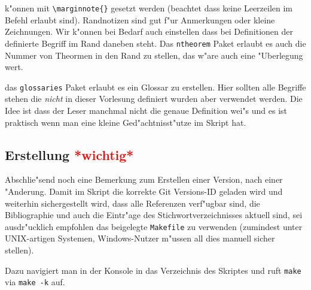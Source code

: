 \documentclass[paper=A4, twoside, chapterprefix=true, bibliography=totoc, headsepline]{scrbook}
\renewcommand{\thesection}{\arabic{section}}
\renewcommand*{\sectionmarkformat}{\thesection\autodot\enskip}
\begin{document}
\begin{description}[font=\normalfont\itshape]
	k"onnen mit \verb|\marginnote{}| gesetzt werden (beachtet dass keine Leerzeilen im Befehl erlaubt sind).
	Randnotizen sind gut f"ur Anmerkungen oder kleine Zeichnungen.
	Wir k"onnen bei Bedarf auch einstellen dass bei Definitionen der definierte Begriff im Rand daneben steht.
	Das \verb|ntheorem| Paket erlaubt es auch die Nummer von Theormen in den Rand zu stellen, das w"are auch eine "Uberlegung wert.
\item[Glossareintr"age:]
	das \verb|glossaries| Paket erlaubt es ein Glossar zu erstellen.
	Hier sollten alle Begriffe stehen die \emph{nicht} in dieser Vorlesung definiert wurden aber verwendet werden.
	Die Idee ist dass der Leser manchmal nicht die genaue Definition wei"s und es ist praktisch wenn man eine kleine Ged"achtnisst"utze im Skript hat.
\end{description}

\subsection*{Erstellung \textcolor{red}{*wichtig*}}
Abschlie"send noch eine Bemerkung zum Erstellen einer  Version, nach einer "Anderung.
Damit im Skript die korrekte Git Versions-ID geladen wird und weiterhin sichergestellt wird, dass alle Referenzen verf"ugbar sind, die Bibliographie und auch die Eintr"age des Stichwortverzeichnisses aktuell sind, sei ausdr"ucklich empfohlen das beigelegte \verb|Makefile| zu verwenden (zumindest unter UNIX-artigen Systemen, Windows-Nutzer m"ussen all dies manuell sicher stellen).

Dazu navigiert man in der Konsole in das Verzeichnis des Skriptes und ruft \verb|make| via \verb|make -k| auf.


  
  
  



\appendix


\renewcommand*{\othersectionlevelsformat}[3]{\ifstr{#1}{section}{\"Ubung\ #3\ vom\ }{#3\autodot\enskip}}

\renewcommand*{\sectionmarkformat}{\"Ubung \thesection\autodot\ vom\enskip}












\printindex

\printglossaries



\end{document}

